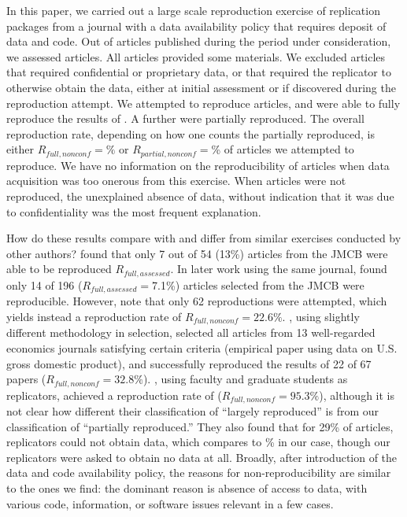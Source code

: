 


In this paper, we carried out a large scale reproduction exercise of replication packages from a journal with a data availability policy that requires deposit of data and code. Out of  articles published during the period under consideration, we assessed   articles. All articles provided some materials. We excluded articles that required confidential or proprietary data, or that required the replicator to otherwise obtain the data, either at initial assessment or if discovered during the reproduction attempt. 
%
We attempted to reproduce  articles, and were able to fully reproduce the results of . A further  were partially reproduced. The overall reproduction rate, depending on how one counts the partially reproduced, is either $R_{{full},{nonconf}} = $$\%$ or  $R_{{partial},{nonconf}} = $\% of articles we attempted to reproduce. We have no information on the reproducibility of articles when data acquisition was too onerous from this exercise. When articles were not reproduced, the  unexplained absence of data, without indication that it was due to confidentiality was the most frequent explanation. 

How do these results compare with and differ from similar exercises conducted by other authors? %
\textcite{Dewald1986} found that only 7 out of 54 (13\%) articles from the \ac{JMCB} were able to be reproduced $R_{{full},{assessed}}$. 
%
In later work using the same journal, \textcite{McCullough2006} found only 14 of 196 ($R_{{full},{assessed}} =$7.1\%) articles selected from the \ac{JMCB} were reproducible. However,  \textcite{McCullough2006} note that only 62 reproductions were attempted, which yields instead a reproduction rate of $R_{{full},{nonconf}} = 22.6\%$. 
\textcite{ChangLi2015}, using slightly different methodology in selection, selected all articles from 13 well-regarded economics journals satisfying certain criteria (empirical paper using data on U.S. gross domestic product), and successfully reproduced the results of 22 of 67 papers ($R_{{full},{nonconf}} = 32.8\%$). \textcite{greiner2023}, using faculty and graduate students as replicators, achieved a reproduction rate of ($R_{{full},{nonconf}} = 95.3\%$), although it is not clear how different their classification of ``largely reproduced'' is from our classification of ``partially reproduced.'' They also found that for 29\% of articles, replicators could not obtain data, which compares to \% in our case, though our replicators were asked to obtain no data at all. Broadly, after introduction of the data and code availability policy, the reasons for non-reproducibility are similar to the ones we find: the dominant reason is absence of access to data, with various code, information, or software issues relevant in a few cases.

